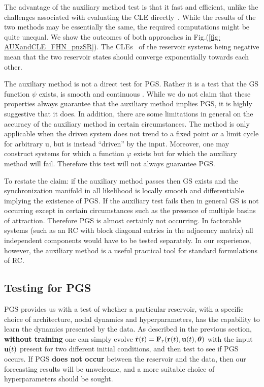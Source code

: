 \documentclass[12pt]{article}
\begin{document}
The advantage of the auxiliary method test is that it fast and efficient, unlike the challenges associated with evaluating the CLE directly~\cite{ose68,eckmann85,abar96}. While the results of the two methods may be essentially the same, the required computations might be quite unequal. We show the outcomes of both approaches in Fig.(\ref{fig: AUXandCLE_FHN_pnzSR}).  The CLEs~\cite{pc90} of the reservoir systems being negative mean that the two reservoir states should converge exponentially towards each other.

The auxiliary method is not a direct test for PGS.  Rather it is a test that the GS function $\psi$ exists, is smooth and continuous \cite{ars96}.  While we do not claim that these properties always guarantee that the auxiliary method implies PGS, it is highly suggestive that it does.  In addition, there are some limitations in general on the accuracy of the auxiliary method in certain circumstances.  The  method is only applicable when the driven system does not trend to a fixed point or a limit cycle for arbitrary u, but is instead ``driven'' by the input.  Moreover, one may construct systems for which a function $\varphi$ exists but for which the auxiliary method will fail.  Therefore this test will not always guarantee PGS.

To restate the claim: if the auxiliary method passes then GS exists and the synchronization manifold in all likelihood is locally smooth and differentiable implying the existence of PGS.  If the auxiliary test fails then in general GS is not occurring except in certain circumstances such as the presence of multiple basins of attraction.  Therefore PGS is almost certainly not occurring. In factorable systems (such as an RC with block diagonal entries in the adjacency matrix) all independent components would have to be tested separately.  In our experience, however, the auxiliary method is a useful practical tool for standard formulations of RC.

\subsection{Testing for PGS \label{sec: testing_pgs}}

PGS provides us with a test of whether a particular reservoir, with a specific choice of architecture, nodal dynamics and hyperparameters, has the capability to learn the dynamics presented by the data.  As described in the previous section, {\bf without training} one can simply evolve $\dot{\mbox{{\bf r}}}(t) = \mbox{$\bf{F}$}_r(\mbox{{\bf r}}(t), \mbox{$\bf{u}$}(t),\mbox{$\boldsymbol{\theta}$})$ with the input $\mbox{$\bf{u}$}(t)$ present for two different initial conditions, and then test to see if PGS occurs.  If PGS {\bf does not occur} between the reservoir and the data, then our forecasting results will be unwelcome, and a more suitable choice of hyperparameters should be sought. 
\end{document}
